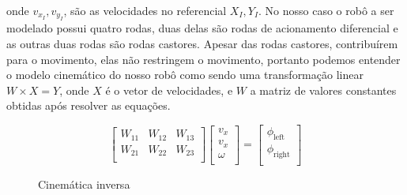 onde $v_{x_I}, v_{y_I}$, são as velocidades no referencial $X_I,Y_I$.
No nosso caso o robô a ser modelado possui quatro rodas, duas delas são
rodas de acionamento diferencial e as outras duas rodas são rodas castores.
Apesar das rodas castores, contribuírem para o movimento, elas não restringem
o movimento, portanto podemos entender o modelo cinemático do nosso robô
como sendo uma transformação linear $W \times X = Y$, onde $X$ é o vetor
de velocidades, e $W$ a matriz de valores constantes obtidas após resolver
as equações.
% 
\begin{figure}[H]
    \[
    \begin{bmatrix}
        W_{11} &  W_{12} & W_{13} \\
        W_{21} &  W_{22} & W_{23} \\
    \end{bmatrix}
    \begin{bmatrix}
        v_x \\
        v_x \\
        \omega \\
    \end{bmatrix}
    =
    \begin{bmatrix}
        \phi_{\text{left}} \\
        \phi_{\text{right}} \\
    \end{bmatrix}
\]
    \caption{Cinemática inversa}
\end{figure}


